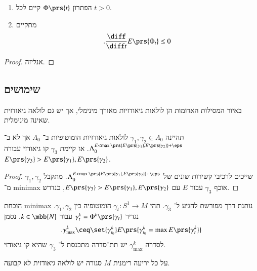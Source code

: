 \documentclass[a4paper,10pt,twoside,openany]{book}
\begin{document}
\begin{theorem}
\begin{enumerate}
\item הפתרון
$\Phi\prs{t}$
קיים לכל
$t > 0$.
\item מתקיים
\[\text{.} \frac{\diff}{\diff t} E\prs{\Phi_t} \leq 0\]
\end{enumerate}
\end{theorem}

\begin{proof}
אנליזה.
\end{proof}

\subsection{שימושים}

\begin{example}
באיור
המסילות האדומות הן לולאות גיאודזיות מאורך מינימלי, אך יש גם לולאה גיאודזית שאינה מינימלית.
\end{example}

\begin{theorem}
תהיינה
$\gamma_1, \gamma_2 \in \Lambda_0$
לולאות גיאודזיות הומוטופיות ב־%
$\Lambda_0$
אך לא ב־%
$\Lambda_0^{E < \max\prs{E\prs{\gamma_1}, E\prs{\gamma_2}} + \eps}$.
אז קיימת
$\gamma_3$
קו גיאודזי עבורה
$E\prs{\gamma_3} > E\prs{\gamma_1}, E\prs{\gamma_2}$.
\end{theorem}

\begin{proof}
$\gamma_1, \gamma_2$
שייכים לרכיבי קשירות שונים של
$\Lambda_0^{E < \max\prs{E\prs{\gamma_1}, E\prs{\gamma_2}} + \eps}$.
מתקבל מ־%
\textenglish{minimax}
אוכף
$\gamma_3$
עבור
$E$
עם
$E\prs{\gamma_3} > E\prs{\gamma_1}, E\prs{\gamma_2}$,
כנדרש.
\end{proof}

\begin{remark}
הוכחת
\textenglish{minimax}
נותנת דרך מפורשת להגיע ל־%
$\gamma_3$.
תהי
$\gamma_t \colon S^1 \to M$
הומוטופיה בין
$\gamma_1, \gamma_2$.
נגדיר
$\gamma_t^k = \Phi^k\prs{\gamma_t}$
עבור
$k \in \mbb{N}$.
נסמן
\[\text{.} \gamma^k_{\max} \ceq \set{\gamma_{t_0}^k}E\prs{\gamma_{t_0}^k = \max E\prs{\gamma_t^k}}\]
לסדרה
$\gamma_{\max}^k$
יש תת־סדרה מתכנסת ל־%
$\gamma_3$
שהיא קו גיאודזי.
\end{remark}

\begin{theorem}
על כל יריעה רימנית
$M$
סגורה יש לולאה גיאודזית לא קבועה.
\end{theorem}
\end{document}
